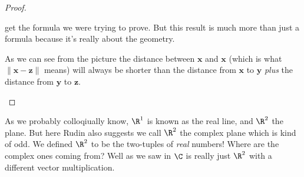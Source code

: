 \documentclass[../../templates/section]{subfiles}
\begin{document}
\begin{proof}
\begin{itemize}
        get the formula we were trying to prove. But this result is much more
        than just a formula because it's really about the geometry.
        \begin{center}
        \end{center}
        As we can see from the picture the distance between $\mathbf{x}$ and
        $\mathbf{x}$ (which is what $\|\mathbf{x} - \mathbf{z}\|$ means) will
        always be shorter than the distance from $\mathbf{x}$ to $\mathbf{y}$
        \emph{plus} the distance from $\mathbf{y}$ to $\mathbf{z}$.
    \end{itemize}
\end{proof}

As we probably colloqiually know, $\R^1$ is known as the real line, and $\R^2$
the plane. But here Rudin also suggests we call $\R^2$ the complex plane which
is kind of odd. We defined $\R^2$ to be the two-tuples of \emph{real} numbers!
Where are the complex ones coming from? Well as we saw in
$\C$ is really just $\R^2$ with a different vector multiplication.
\end{document}
